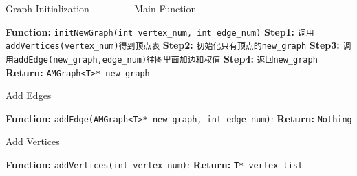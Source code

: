 \begin{algorithm}
    \caption{Graph Initialization \ \ —— \ \ Main Function}
    \begin{algorithmic}[1]
    \State \textbf{Function:} \texttt{initNewGraph(int vertex\_num, int edge\_num)}
        \State \quad \textbf{Step1:} \texttt{调用addVertices(vertex\_num)得到顶点表}
        \State \quad \textbf{Step2:} \texttt{初始化只有顶点的new\_graph}
        \State \quad \textbf{Step3:} \texttt{调用addEdge(new\_graph,edge\_num)往图里面加边和权值}
        \State \quad \textbf{Step4:} \texttt{返回new\_graph}
    \State \textbf{Return:} \texttt{AMGraph<T>* new\_graph}
    \end{algorithmic}
\end{algorithm}
    
\begin{algorithm}
    \caption{Add Edges}
    \begin{algorithmic}[1]
    \State \textbf{Function:} \texttt{addEdge(AMGraph<T>* new\_graph, int edge\_num)}:
    \State \textbf{Return:} \texttt{Nothing}
    \end{algorithmic}
\end{algorithm}
    
\begin{algorithm}
    \caption{Add Vertices}
    \begin{algorithmic}[1]
    \State \textbf{Function:} \texttt{addVertices(int vertex\_num)}:
    \State \textbf{Return:} \texttt{T* vertex\_list}
    \end{algorithmic}
\end{algorithm}